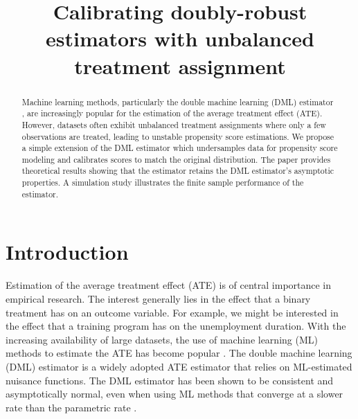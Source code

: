 
\title{Calibrating doubly-robust estimators with unbalanced treatment assignment}
\maketitle

\begin{abstract}
Machine learning methods, particularly the double machine learning (DML) estimator \citep{Chernozhukov2018}, are increasingly popular for the estimation of the average treatment effect (ATE). However, datasets often exhibit unbalanced treatment assignments where only a few observations are treated, leading to unstable propensity score estimations. We propose a simple extension of the DML estimator which undersamples data for propensity score modeling and calibrates scores to match the original distribution. The paper provides theoretical results showing that the estimator retains the DML estimator's asymptotic properties. A simulation study illustrates the finite sample performance of the estimator.
\end{abstract}





\section{Introduction}
Estimation of the average treatment effect (ATE) is of central importance in empirical research. The interest generally lies in the effect that a binary treatment has on an outcome variable. For example, we might be interested in the effect that a training program has on the unemployment duration. With the increasing availability of large datasets, the use of machine learning (ML) methods to estimate the ATE has become popular \citep{Athey2019,Liuyi2021}. The double machine learning (DML) estimator \citep{Chernozhukov2018} is a widely adopted ATE estimator that relies on ML-estimated nuisance functions. The DML estimator has been shown to be consistent and asymptotically normal, even when using ML methods that converge at a slower rate than the parametric rate \citep{Chernozhukov2018}.

